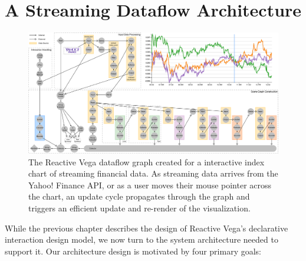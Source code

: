 \graphicspath{{./vega-arch/figures/}}
\chapter{A Streaming Dataflow Architecture}
\label{sec:vg:arch}

\begin{figure}[h!]
  \vspace{-40pt}
  \centering
  \includegraphics[width=\columnwidth]{teaser}
  \caption{The Reactive Vega dataflow graph created for a interactive index
  chart of streaming financial data. As streaming data arrives from the Yahoo!
  Finance API, or as a user moves their mouse pointer across the chart, an
  update cycle propagates through the graph and triggers an efficient update and
  re-render of the visualization.}
  \label{fig:vg:teaser}
\end{figure}

While the previous chapter describes the design of Reactive Vega's declarative
interaction design model, we now turn to the system architecture needed to
support it. Our architecture design is motivated by four primary goals:

